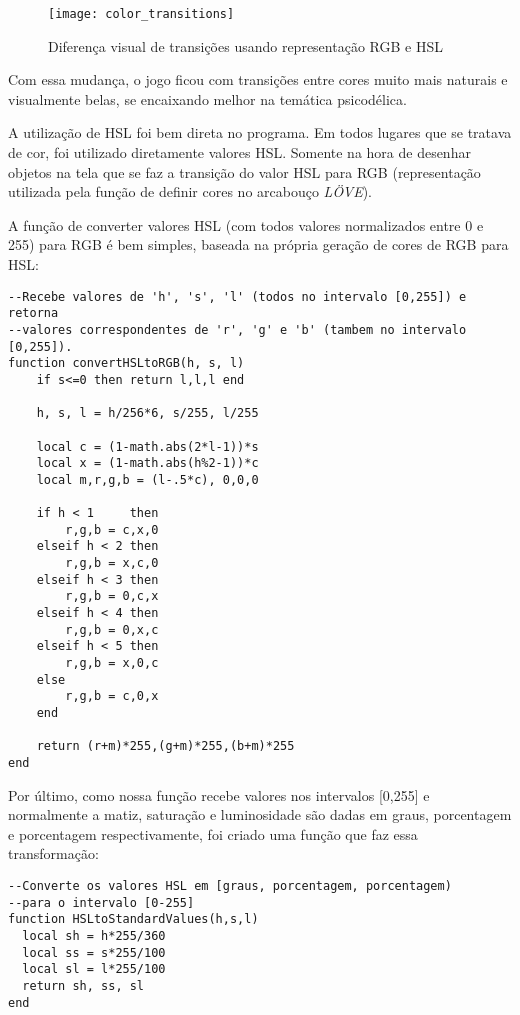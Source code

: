 \begin{figure}[h!]
\texttt{[image: color\_transitions]}
\centering
\caption{Diferença visual de transições usando representação RGB e HSL}
\end{figure}

Com essa mudança, o jogo ficou com transições entre cores muito mais naturais e visualmente belas, se encaixando melhor na temática psicodélica.

A utilização de HSL foi bem direta no programa. Em todos lugares que se tratava de cor, foi utilizado diretamente valores HSL. Somente na hora de desenhar objetos na tela que se faz a transição do valor HSL para RGB (representação utilizada pela função de definir cores no arcabouço \textit{LÖVE}).

A função de converter valores HSL (com todos valores normalizados entre 0 e 255) para RGB é bem simples, baseada na própria geração de cores de RGB para HSL:

\begin{lstlisting}[language={[5.0]lua}]
--Recebe valores de 'h', 's', 'l' (todos no intervalo [0,255]) e retorna
--valores correspondentes de 'r', 'g' e 'b' (tambem no intervalo [0,255]).
function convertHSLtoRGB(h, s, l)
	if s<=0 then return l,l,l end

	h, s, l = h/256*6, s/255, l/255

	local c = (1-math.abs(2*l-1))*s
	local x = (1-math.abs(h%2-1))*c
	local m,r,g,b = (l-.5*c), 0,0,0

	if h < 1     then
		r,g,b = c,x,0
	elseif h < 2 then
	 	r,g,b = x,c,0
	elseif h < 3 then
	 	r,g,b = 0,c,x
	elseif h < 4 then
	 	r,g,b = 0,x,c
	elseif h < 5 then
	 	r,g,b = x,0,c
	else
	 	r,g,b = c,0,x
	end

	return (r+m)*255,(g+m)*255,(b+m)*255
end
\end{lstlisting}

Por último, como nossa função recebe valores nos intervalos [0,255] e normalmente a matiz, saturação e luminosidade são dadas em graus, porcentagem e porcentagem respectivamente, foi criado uma função que faz essa transformação:

\begin{lstlisting}[language={[5.0]lua}]
--Converte os valores HSL em [graus, porcentagem, porcentagem)
--para o intervalo [0-255]
function HSLtoStandardValues(h,s,l)
  local sh = h*255/360
  local ss = s*255/100
  local sl = l*255/100
  return sh, ss, sl
end
\end{lstlisting}
